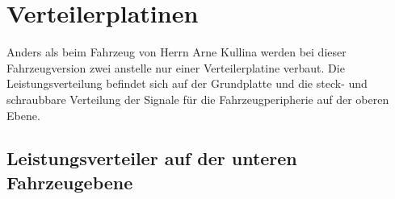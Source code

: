 

\pagestyle{fancy}
\rhead{\thepage} \chead{} 
\cfoot{}

\section{Verteilerplatinen}\label{Sec8}

Anders als beim Fahrzeug von Herrn Arne Kullina werden bei dieser Fahrzeugversion zwei anstelle nur einer Verteilerplatine verbaut. Die Leistungsverteilung befindet sich auf der Grundplatte und die steck- und schraubbare Verteilung der Signale für die Fahrzeugperipherie auf der oberen Ebene. 

\subsection{Leistungsverteiler auf der unteren Fahrzeugebene}\label{Sec8Sub1}


